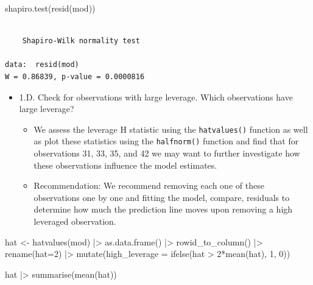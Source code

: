 \documentclass[
  letterpaper,
  DIV=11,
  numbers=noendperiod]{scrartcl}
\newenvironment{Shaded}{\begin{snugshade}}{\end{snugshade}}
\newcommand{\AttributeTok}[1]{\textcolor[rgb]{0.40,0.45,0.13}{#1}}
\newcommand{\DecValTok}[1]{\textcolor[rgb]{0.68,0.00,0.00}{#1}}
\newcommand{\FunctionTok}[1]{\textcolor[rgb]{0.28,0.35,0.67}{#1}}
\newcommand{\NormalTok}[1]{\textcolor[rgb]{0.00,0.23,0.31}{#1}}
\newcommand{\OtherTok}[1]{\textcolor[rgb]{0.00,0.23,0.31}{#1}}
\newcommand{\SpecialCharTok}[1]{\textcolor[rgb]{0.37,0.37,0.37}{#1}}
\providecommand{\tightlist}{%
  \setlength{\itemsep}{0pt}\setlength{\parskip}{0pt}}\usepackage{longtable,booktabs,array}
\begin{document}
\begin{Shaded}
\begin{Highlighting}[]
\FunctionTok{shapiro.test}\NormalTok{(}\FunctionTok{resid}\NormalTok{(mod))}
\end{Highlighting}
\end{Shaded}

\begin{verbatim}

    Shapiro-Wilk normality test

data:  resid(mod)
W = 0.86839, p-value = 0.0000816
\end{verbatim}

\begin{itemize}
\item
  1.D. Check for observations with large leverage. Which observations
  have large leverage?

  \begin{itemize}
  \tightlist
  \item
    We assess the leverage H statistic using the \texttt{hatvalues()}
    function as well as plot these statistics using the
    \texttt{halfnorm()} function and find that for observations 31, 33,
    35, and 42 we may want to further investigate how these observations
    influence the model estimates.
  \item
    Recommendation: We recommend removing each one of these observations
    one by one and fitting the model, compare, residuals to determine
    how much the prediction line moves upon removing a high leveraged
    observation.
  \end{itemize}
\end{itemize}

\begin{Shaded}
\begin{Highlighting}[]
\NormalTok{hat }\OtherTok{\textless{}{-}} \FunctionTok{hatvalues}\NormalTok{(mod) }\SpecialCharTok{|\textgreater{}} 
  \FunctionTok{as.data.frame}\NormalTok{() }\SpecialCharTok{|\textgreater{}} 
  \FunctionTok{rowid\_to\_column}\NormalTok{() }\SpecialCharTok{|\textgreater{}} 
  \FunctionTok{rename}\NormalTok{(}\AttributeTok{hat=}\DecValTok{2}\NormalTok{) }\SpecialCharTok{|\textgreater{}} 
  \FunctionTok{mutate}\NormalTok{(}\AttributeTok{high\_leverage =} \FunctionTok{ifelse}\NormalTok{(hat  }\SpecialCharTok{\textgreater{}} \DecValTok{2}\SpecialCharTok{*}\FunctionTok{mean}\NormalTok{(hat), }\DecValTok{1}\NormalTok{, }\DecValTok{0}\NormalTok{)) }

\NormalTok{hat }\SpecialCharTok{|\textgreater{}} \FunctionTok{summarise}\NormalTok{(}\FunctionTok{mean}\NormalTok{(hat))}
\end{Highlighting}
\end{Shaded}
\end{document}
